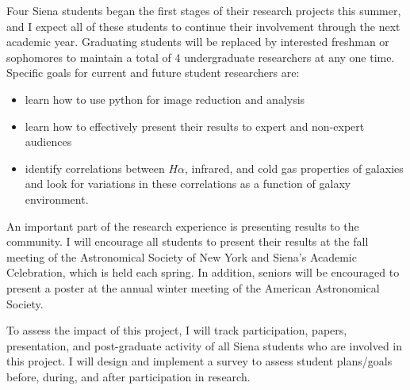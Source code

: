 \documentclass[11pt, preprint]{aastex}
\newcommand{\ha}{$H\alpha$}
\begin{document}
{Four Siena students began the first stages of their research projects this summer,
and I expect all of these students to continue their involvement through the next academic year.
Graduating students will be replaced by interested freshman or sophomores to maintain a total
of 4 undergraduate researchers at any one time.  
Specific goals for current and future student researchers are:
\vspace*{-.2cm}
\begin{itemize}
\vspace*{-.25cm}\item learn how to use python for image reduction and
analysis 
\vspace*{-.25cm}\item learn how to effectively present their results to expert and
non-expert audiences
\vspace*{-.25cm}\item identify correlations between \ha, infrared, and
cold gas properties of galaxies and look for variations in these correlations as a function of galaxy environment.
\end{itemize}
\vspace*{-.2cm}


An important part of the research experience is presenting results
to the community. I will encourage all students 
to present their results at the fall meeting of the 
Astronomical Society of New York and Siena's Academic Celebration, which
is held each spring.  In addition, seniors will be encouraged to
present a poster at the 
annual winter meeting of the American Astronomical Society.  

To assess the impact of this project, I will track participation, papers, 
presentation, and post-graduate activity of all Siena students
who are involved in this project.  I will design and implement a survey to 
assess student plans/goals before, during, and after
participation in research.

}
\end{document}
